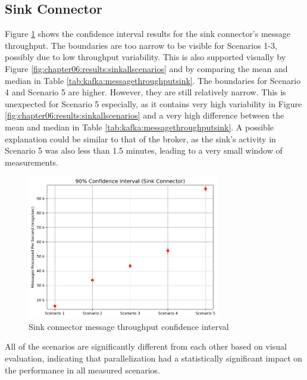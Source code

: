 \subsection{Sink Connector}
Figure \ref{fig:chapter07:discussion:sinkmessageci} shows the confidence interval results for the sink connector's message throughput. The boundaries are too narrow to be visible for Scenarios 1-3, possibly due to low throughput variability. This is also supported visually by Figure \ref{fig:chapter06:results:sinkallscenarios} and by comparing the mean and median in Table \ref{tab:kafka:messagethroughputsink}. The boundaries for Scenario 4 and Scenario 5 are higher. However, they are still relatively narrow. This is unexpected for Scenario 5 especially, as it contains very high variability in Figure \ref{fig:chapter06:results:sinkallscenarios} and a very high difference between the mean and median in Table \ref{tab:kafka:messagethroughputsink}. A possible explanation could be similar to that of the broker, as the sink's activity in Scenario 5 was also less than 1.5 minutes, leading to a very small window of measurements.

\begin{figure}[htbp]
    \centering
    \includegraphics[width=0.75\textwidth]{chapters/images/confidence-intervals/sink-message-ci.png}
    \caption{Sink connector message throughput confidence interval}
    \label{fig:chapter07:discussion:sinkmessageci}
\end{figure}

All of the scenarios are significantly different from each other based on visual evaluation, indicating that parallelization had a statistically significant impact on the performance in all measured scenarios.

